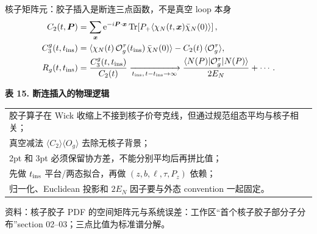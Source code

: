 \documentclass[UTF8,aspectratio=169,11pt]{ctexbeamer}
\newcommand{\source}[1]{%
  \par\vspace{-0.08em}%
  \noindent\parbox[t]{0.97\linewidth}{\raggedright\scriptsize\color{muted}资料：#1}\par}
\newcommand{\Tr}{\operatorname{Tr}}
\newcommand{\e}{\mathrm{e}}
\begin{document}
\begin{frame}[t]{核子矩阵元：胶子插入是断连三点函数，不是真空 loop 本身}
  \begin{align*}
    C_2(t,\boldsymbol P)&=\sum_{\boldsymbol x}
      \e^{-i\boldsymbol P\cdot\boldsymbol x}
      \Tr\!\left[P_+\langle\chi_N(t,\boldsymbol x)\bar\chi_N(0)\rangle\right],\\
    C_3^g(t,t_{\rm ins})&=
      \langle\chi_N(t)\,\mathcal O_g^\tau(t_{\rm ins})\,\bar\chi_N(0)\rangle
      -C_2(t)\,\langle\mathcal O_g^\tau\rangle,\\
    R_g(t,t_{\rm ins})&=\frac{C_3^g(t,t_{\rm ins})}{C_2(t)}
      \xrightarrow[t_{\rm ins},\,t-t_{\rm ins}\to\infty]{}
      \frac{\langle N(P)|\mathcal O_g^\tau|N(P)\rangle}{2E_N}
      +\cdots .
  \end{align*}
  \begin{center}
  \textbf{表 15. 断连插入的物理逻辑}
  \vspace{0.12em}
  \begin{tabular}{@{}p{\linewidth}@{}}
    \toprule
    胶子算子在 Wick 收缩上不接到核子价夸克线，但通过规范组态平均与核子相关；\\
    真空减法 $\langle C_2\rangle\langle O_g\rangle$ 去除无核子背景；\\
    2pt 和 3pt 必须保留协方差，不能分别平均后再拼比值；\\
    先做 $t_{\rm ins}$ 平台/两态拟合，再做 $(z,b,\ell,\tau,P_z)$ 依赖；\\
    归一化、Euclidean 投影和 $2E_N$ 因子要与外态 convention 一起固定。\\
    \bottomrule
  \end{tabular}
  \end{center}
  \source{核子胶子 PDF 的空间矩阵元与系统误差：工作区“首个核子胶子部分子分布”section 02--03；三点比值为标准谱分解。}
\end{frame}
\end{document}
